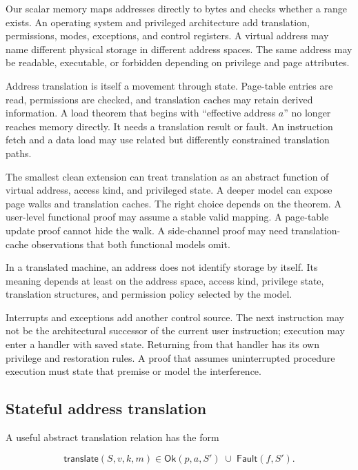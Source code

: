 Our scalar memory maps addresses directly to bytes and checks whether a range
exists. An operating system and privileged architecture add translation,
permissions, modes, exceptions, and control registers. A virtual address may
name different physical storage in different address spaces. The same address
may be readable, executable, or forbidden depending on privilege and page
attributes.

Address translation is itself a movement through state. Page-table entries are
read, permissions are checked, and translation caches may retain derived
information. A load theorem that begins with ``effective address \(a\)'' no
longer reaches memory directly. It needs a translation result or fault. An
instruction fetch and a data load may use related but differently constrained
translation paths.

The smallest clean extension can treat translation as an abstract function of
virtual address, access kind, and privileged state. A deeper model can expose
page walks and translation caches. The right choice depends on the theorem.
A user-level functional proof may assume a stable valid mapping. A page-table
update proof cannot hide the walk. A side-channel proof may need translation-
cache observations that both functional models omit.

\begin{definition}[title={Contextual address meaning}]
In a translated machine, an address does not identify storage by itself. Its
meaning depends at least on the address space, access kind, privilege state,
translation structures, and permission policy selected by the model.
\end{definition}

Interrupts and exceptions add another control source. The next instruction may
not be the architectural successor of the current user instruction; execution
may enter a handler with saved state. Returning from that handler has its own
privilege and restoration rules. A proof that assumes uninterrupted procedure
execution must state that premise or model the interference.

\subsection{Stateful address translation}

A useful abstract translation relation has the form

\[
  \mathsf{translate}(S,v,k,m)
  \in
  \mathsf{Ok}(p,a,S')\;\cup\;\mathsf{Fault}(f,S').
\]

